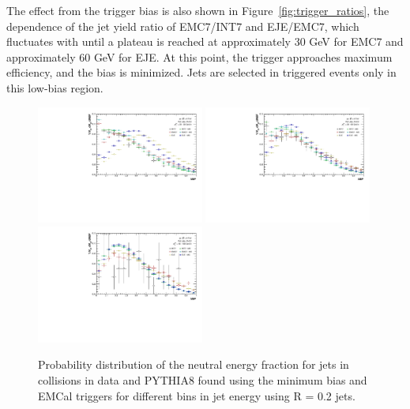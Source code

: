 The effect from the trigger bias is also shown in Figure~\ref{fig:trigger_ratios}, the \pT dependence of the jet yield ratio of EMC7/INT7 and EJE/EMC7, which fluctuates with \pT until a plateau is reached at approximately 30 GeV for EMC7 and approximately 60 GeV for EJE. At this point, the trigger approaches maximum efficiency, and the bias is minimized. Jets are selected in triggered events only in this low-bias region. 


\begin{figure}[hbt!]
    \centering
    \includegraphics[width=0.49\textwidth]{figures/TriggerBias/NEF/All/hNEF_20-30GeV_R02.pdf}
    \includegraphics[width=0.49\textwidth]{figures/TriggerBias/NEF/All/hNEF_30-60GeV_R02.pdf}
    \includegraphics[width=0.49\textwidth]{figures/TriggerBias/NEF/All/hNEF_60-100GeV_R02.pdf}
    \caption{Probability distribution of the neutral energy fraction for jets in \pp collisions in data and PYTHIA8 found using the minimum bias and EMCal triggers for different bins in jet energy using R = 0.2 jets.}
    \label{fig:NEF}
\end{figure}

